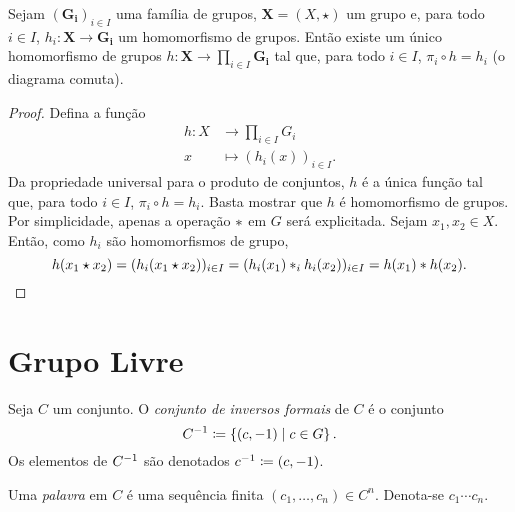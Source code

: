 \begin{prop}
Sejam $(\bm{G_i})_{i \in I}$ uma família de grupos, $\bm X = (X,\star)$ um grupo e, para todo $i \in I$, $h_i: \bm X \to \bm{G_i}$ um homomorfismo de grupos. Então existe um único homomorfismo de grupos $h: \bm X \to \prod_{i \in I} \bm{G_i}$ tal que, para todo $i \in I$, $\pi_i \circ h = h_i$ (o diagrama comuta).
\begin{figure}[!h]
\centering
{}
\end{figure}
\end{prop}
\begin{proof}
Defina a função
	\begin{align*}
	h: X &\to \prod_{i \in I} G_i \\
		x &\mapsto (h_i(x))_{i \in I}.
	\end{align*}
Da propriedade universal para o produto de conjuntos, $h$ é a única função tal que, para todo $i \in I$, $\pi_i \circ h = h_i$. Basta mostrar que $h$ é homomorfismo de grupos. Por simplicidade, apenas a operação $\ast$ em $G$ será explicitada. Sejam $x_1,x_2 \in X$. Então, como $h_i$ são homomorfismos de grupo,
	\begin{equation*}
	h(x_1 \star x_2) = (h_i(x_1 \star x_2))_{i \in I} = (h_i(x_1) \ast_i h_i(x_2))_{i \in I} = h(x_1) \ast h(x_2).
	\end{equation*}
\end{proof}


\cleardoublepage
\section{Grupo Livre}

\begin{defi}
Seja $C$ um conjunto. O \emph{conjunto de inversos formais} de $C$ é o conjunto
	\begin{equation*}
	C\inv \coloneqq \set{(c,-1)}{c \in G}.
	\end{equation*}
Os elementos de $C^{-1}$ são denotados $c\inv \coloneqq (c,-1)$.

Uma \emph{palavra} em $C$ é uma sequência finita $(c_1,\ldots,c_n) \in C^n$. Denota-se $c_1 \cdots c_n$.
\end{defi}

